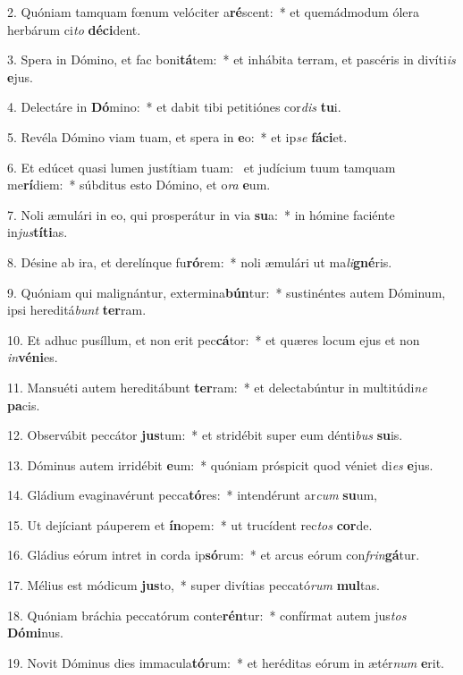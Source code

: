 2. Quóniam tamquam fœnum velóciter a\textbf{ré}scent:~*  et quemádmodum ólera herbárum ci\textit{to} \textbf{dé}\textbf{ci}dent.\

3. Spera in Dómino, et fac boni\textbf{tá}tem:~*  et inhábita terram, et pascéris in divíti\textit{is} \textbf{e}jus.\

4. Delectáre in \textbf{Dó}mino:~*  et dabit tibi petitiónes cor\textit{dis} \textbf{tu}i.\

5. Revéla Dómino viam tuam, et spera in \textbf{e}o:~*  et ip\textit{se} \textbf{fá}\textbf{ci}et.\

6. Et edúcet quasi lumen justítiam tuam: \dag\  et judícium tuum tamquam me\textbf{rí}diem:~*  súbditus esto Dómino, et o\textit{ra} \textbf{e}um.\

7. Noli æmulári in eo, qui prosperátur in via \textbf{su}a:~*  in hómine faciénte in\textit{jus}\textbf{tí}\textbf{ti}as.\

8. Désine ab ira, et derelínque fu\textbf{ró}rem:~*  noli æmulári ut ma\textit{li}\textbf{gné}ris.\

9. Quóniam qui malignántur, extermina\textbf{bún}tur:~*  sustinéntes autem Dóminum, ipsi hereditá\textit{bunt} \textbf{ter}ram.\

10. Et adhuc pusíllum, et non erit pec\textbf{cá}tor:~*  et quæres locum ejus et non \textit{in}\textbf{vé}\textbf{ni}es.\

11. Mansuéti autem hereditábunt \textbf{ter}ram:~*  et delectabúntur in multitúdi\textit{ne} \textbf{pa}cis.\

12. Observábit peccátor \textbf{jus}tum:~*  et stridébit super eum dénti\textit{bus} \textbf{su}is.\

13. Dóminus autem irridébit \textbf{e}um:~*  quóniam próspicit quod véniet di\textit{es} \textbf{e}jus.\

14. Gládium evaginavérunt pecca\textbf{tó}res:~*  intendérunt ar\textit{cum} \textbf{su}um,\

15. Ut dejíciant páuperem et \textbf{ín}opem:~*  ut trucídent rec\textit{tos} \textbf{cor}de.\

16. Gládius eórum intret in corda ip\textbf{só}rum:~*  et arcus eórum con\textit{frin}\textbf{gá}tur.\

17. Mélius est módicum \textbf{jus}to,~*  super divítias peccató\textit{rum} \textbf{mul}tas.\

18. Quóniam bráchia peccatórum conte\textbf{rén}tur:~*  confírmat autem jus\textit{tos} \textbf{Dó}\textbf{mi}nus.\

19. Novit Dóminus dies immacula\textbf{tó}rum:~*  et heréditas eórum in ætér\textit{num} \textbf{e}rit.\

